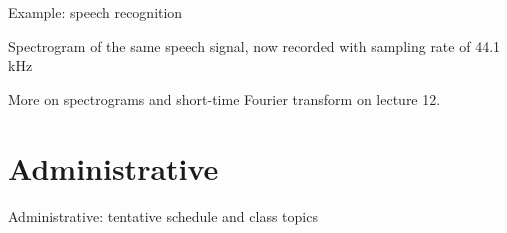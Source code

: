 \documentclass[10pt]{beamer}
\begin{document}
%
\begin{frame}{Example: speech recognition}

Spectrogram of the same speech signal, now recorded with sampling rate of 44.1 kHz
\vspace{0.5cm}

\begin{center}
\end{center}

More on spectrograms and short-time Fourier transform on lecture 12.

\end{frame}


\section{Administrative}

%
\begin{frame}{Administrative: tentative schedule and class topics}

\centering
\resizebox{\linewidth}{!}{}

\end{frame}
\end{document}
